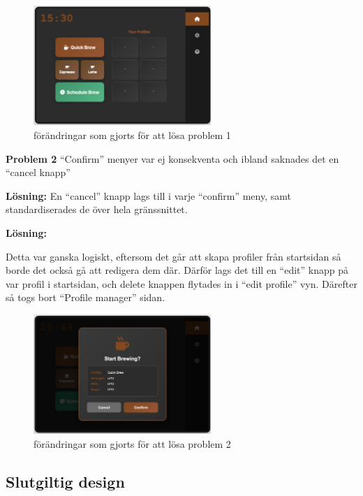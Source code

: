   
\begin{figure}[H]
    \centering
    \includegraphics[width=0.6\textwidth]{bilder/3problem1.png}
    \caption{ förändringar som gjorts för att lösa problem 1}
    \label{fig:forbattring4}
\end{figure}

\textbf{Problem 2} “Confirm” menyer var ej konsekventa och ibland saknades det en “cancel knapp” 

  

\textbf{Lösning:} En “cancel” knapp lags till i varje “confirm” meny, samt  
standardiserades de över hela gränssnittet.  

\textbf{Lösning:}  

Detta var ganska logiskt, eftersom det går att skapa profiler från startsidan så borde det också gå att redigera dem där. Därför lags det till en “edit” knapp  på var profil i startsidan, och delete knappen flytades in i “edit profile” vyn.  Därefter så togs bort “Profile manager” sidan.  


\begin{figure}[H]
    \centering
    \includegraphics[width=0.6\textwidth]{bilder/4problem2.png}
    \caption{ förändringar som gjorts för att lösa problem 2}
    \label{fig:forbattring5}
\end{figure}


\subsection{Slutgiltig design}

